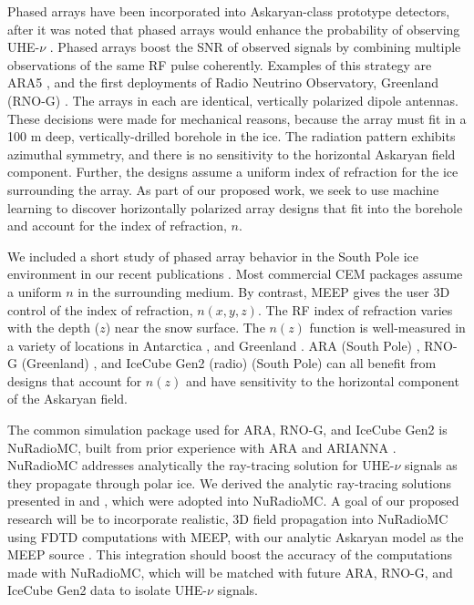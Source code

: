 \documentclass[../../main.tex]{subfiles}
\begin{document}
Phased arrays have been incorporated into Askaryan-class prototype detectors, after it was noted that phased arrays would enhance the probability of observing UHE-$\nu$ \cite{Vieregg_2016,AVVA201746}.  Phased arrays boost the SNR of observed signals by combining multiple observations of the same RF pulse coherently.  Examples of this strategy are ARA5 \cite{PhysRevD.105.122006}, and the first deployments of Radio Neutrino Observatory, Greenland (RNO-G) \cite{rno}.  The arrays in each are identical, vertically polarized dipole antennas.  These decisions were made for mechanical reasons, because the array must fit in a 100 m deep, vertically-drilled borehole in the ice.  The radiation pattern exhibits azimuthal symmetry, and there is no sensitivity to the horizontal Askaryan field component.  Further, the designs assume a uniform index of refraction for the ice surrounding the array.  As part of our proposed work, we seek to use machine learning to discover horizontally polarized array designs that fit into the borehole and account for the index of refraction, $n$.  \\ \vspace{2.5mm}

We included a short study of phased array behavior in the South Pole ice environment in our recent publications \cite{electronics10040415,meepcon2022,10.1016/j.cpc.2009.11.008}.  Most commercial CEM packages assume a uniform $n$ in the surrounding medium.  By contrast, MEEP gives the user 3D control of the index of refraction, $n(x,y,z)$.  The RF index of refraction varies with the depth ($z$) near the snow surface.  The $n(z)$ function is well-measured in a variety of locations in Antarctica \cite{horizPaper}, and Greenland \cite{deaconu_2018}.  ARA (South Pole) \cite{PhysRevD.105.122006}, RNO-G (Greenland) \cite{rno}, and IceCube Gen2 (radio) (South Pole) \cite{Aartsen_2021} can all benefit from designs that account for $n(z)$ and have sensitivity to the horizontal component of the Askaryan field. \\ \vspace{2.5mm}

The common simulation package used for ARA, RNO-G, and IceCube Gen2 is NuRadioMC, built from prior experience with ARA and ARIANNA \cite{10.1140/epjc/s10052-020-7612-8,10.1109/tns.2015.2468182,10.1016/j.astropartphys.2011.11.010,Barwick:2014pca,10.1103/physrevd.102.043021}.  NuRadioMC addresses analytically the ray-tracing solution for UHE-$\nu$ signals as they propagate through polar ice.  We derived the analytic ray-tracing solutions presented in \cite{10.1140/epjc/s10052-020-7612-8} and \cite{horizPaper}, which were adopted into NuRadioMC.  A goal of our proposed research will be to incorporate realistic, 3D field propagation into NuRadioMC using FDTD computations with MEEP, with our analytic Askaryan model as the MEEP source \cite{PhysRevD.105.123019,10.22323/1.395.1217}.  This integration should boost the accuracy of the computations made with NuRadioMC, which will be matched with future ARA, RNO-G, and IceCube Gen2 data to isolate UHE-$\nu$ signals.
\end{document}
